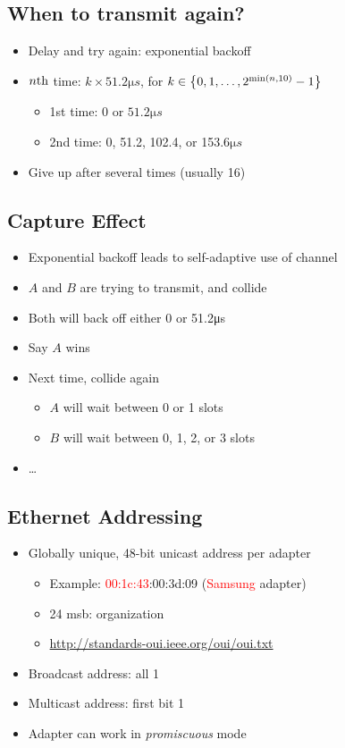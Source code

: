 \subsection{When to transmit again?}
\begin{itemize}[nosep]
    \item Delay and try again: exponential backoff
    \item $n\text{th}$ time: $k\times51.2\si{\micro s}$, for $k\in\left\{0,1,\dots,2^{\min(n,10)} - 1\right\}$
          \begin{itemize}[nosep]
              \item 1st time: 0 or $51.2\si{\micro s}$
              \item 2nd time: 0, 51.2, 102.4, or 153.6$\si{\micro s}$
          \end{itemize}
    \item Give up after several times (usually 16)
\end{itemize}

\subsection{Capture Effect}
\begin{itemize}[nosep]
    \item Exponential backoff leads to self-adaptive use of channel
    \item $A$ and $B$ are trying to transmit, and collide
    \item Both will back off either 0 or 51.2\si{\micro s}
    \item Say $A$ wins
    \item Next time, collide again
          \begin{itemize}[nosep]
              \item $A$ will wait between 0 or 1 slots
              \item $B$ will wait between 0, 1, 2, or 3 slots
          \end{itemize}
    \item \dots
\end{itemize}

\subsection{Ethernet Addressing}
\begin{itemize}[nosep]
    \item Globally unique, 48-bit unicast address per adapter
          \begin{itemize}[nosep]
              \item Example: \textcolor{red}{00:1c:43}:00:3d:09 (\textcolor{red}{Samsung} adapter)
              \item 24 msb: organization
              \item \url{http://standards-oui.ieee.org/oui/oui.txt}
          \end{itemize}
    \item Broadcast address: all 1
    \item Multicast address: first bit 1
    \item Adapter can work in \emph{promiscuous} mode
\end{itemize}

